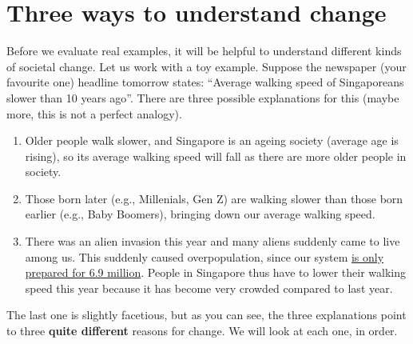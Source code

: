 \documentclass[openany]{book}
\begin{document}
\section{Three ways to understand
change}\label{three-ways-to-understand-change}

Before we evaluate real examples, it will be helpful to understand
different kinds of societal change. Let us work with a toy example.
Suppose the newspaper (your favourite one) headline tomorrow states:
``Average walking speed of Singaporeans slower than 10 years ago''.
There are three possible explanations for this (maybe more, this is not
a perfect analogy).

\begin{enumerate}
\def\labelenumi{\arabic{enumi}.}
\item
  Older people walk slower, and Singapore is an ageing society (average
  age is rising), so its average walking speed will fall as there are
  more older people in society.
\item
  Those born later (e.g., Millenials, Gen Z) are walking slower than
  those born earlier (e.g., Baby Boomers), bringing down our average
  walking speed.
\item
  There was an alien invasion this year and many aliens suddenly came to
  live among us. This suddenly caused overpopulation, since our system
  \href{https://www.strategygroup.gov.sg/media-centre/population-white-paper-a-sustainable-population-for-a-dynamic-singapore}{is
  only prepared for 6.9 million}. People in Singapore thus have to lower
  their walking speed this year because it has become very crowded
  compared to last year.
\end{enumerate}

The last one is slightly facetious, but as you can see, the three
explanations point to three \textbf{quite different} reasons for change.
We will look at each one, in order.
\end{document}
